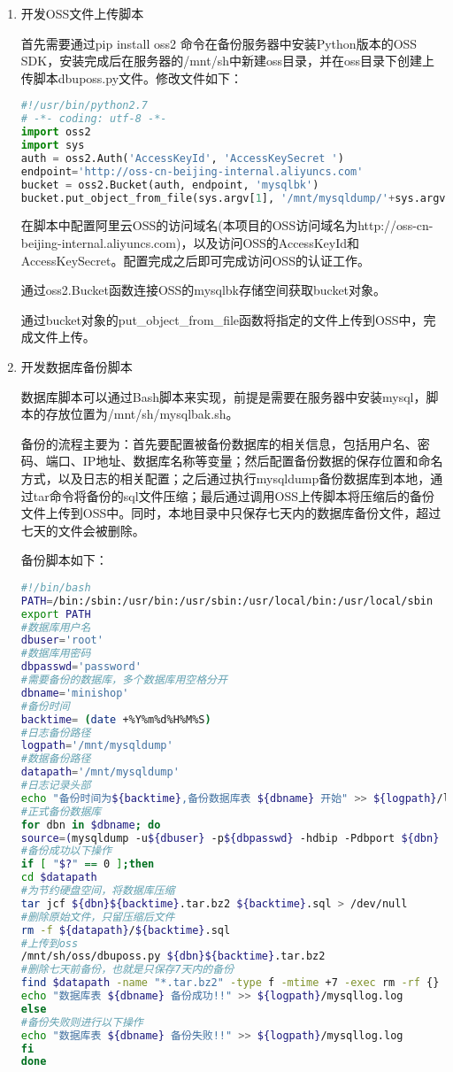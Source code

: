 \begin{enumerate}
\item 开发OSS文件上传脚本

首先需要通过pip install oss2 命令在备份服务器中安装Python版本的OSS SDK，安装完成后在服务器的/mnt/sh中新建oss目录，并在oss目录下创建上传脚本dbuposs.py文件。修改文件如下：
\begin{lstlisting}[language=python]
#!/usr/bin/python2.7
# -*- coding: utf-8 -*-
import oss2
import sys
auth = oss2.Auth('AccessKeyId', 'AccessKeySecret ')
endpoint='http://oss-cn-beijing-internal.aliyuncs.com'
bucket = oss2.Bucket(auth, endpoint, 'mysqlbk')
bucket.put_object_from_file(sys.argv[1], '/mnt/mysqldump/'+sys.argv[1])
\end{lstlisting}
在脚本中配置阿里云OSS的访问域名(本项目的OSS访问域名为http://oss-cn-beijing-internal.aliyuncs.com)，以及访问OSS的AccessKeyId和AccessKeySecret。配置完成之后即可完成访问OSS的认证工作。

通过oss2.Bucket函数连接OSS的mysqlbk存储空间获取bucket对象。

通过bucket对象的put\_object\_from\_file函数将指定的文件上传到OSS中，完成文件上传。
\item 开发数据库备份脚本

数据库脚本可以通过Bash脚本来实现，前提是需要在服务器中安装mysql，脚本的存放位置为/mnt/sh/mysqlbak.sh。

备份的流程主要为：首先要配置被备份数据库的相关信息，包括用户名、密码、端口、IP地址、数据库名称等变量；然后配置备份数据的保存位置和命名方式，以及日志的相关配置；之后通过执行mysqldump备份数据库到本地，通过tar命令将备份的sql文件压缩；最后通过调用OSS上传脚本将压缩后的备份文件上传到OSS中。同时，本地目录中只保存七天内的数据库备份文件，超过七天的文件会被删除。

备份脚本如下：
\begin{lstlisting}[language=bash]
#!/bin/bash
PATH=/bin:/sbin:/usr/bin:/usr/sbin:/usr/local/bin:/usr/local/sbin
export PATH
#数据库用户名
dbuser='root'
#数据库用密码
dbpasswd='password'
#需要备份的数据库，多个数据库用空格分开
dbname='minishop'
#备份时间
backtime= (date +%Y%m%d%H%M%S)
#日志备份路径
logpath='/mnt/mysqldump'
#数据备份路径
datapath='/mnt/mysqldump'
#日志记录头部
echo "备份时间为${backtime},备份数据库表 ${dbname} 开始" >> ${logpath}/log.log
#正式备份数据库
for dbn in $dbname; do
source=(mysqldump -u${dbuser} -p${dbpasswd} -hdbip -Pdbport ${dbn} --set-gtid-purged=OFF > ${logpath}/${backtime}.sql) 2>> ${logpath}/mysqllog.log;
#备份成功以下操作
if [ "$?" == 0 ];then
cd $datapath
#为节约硬盘空间，将数据库压缩
tar jcf ${dbn}${backtime}.tar.bz2 ${backtime}.sql > /dev/null
#删除原始文件，只留压缩后文件
rm -f ${datapath}/${backtime}.sql
#上传到oss
/mnt/sh/oss/dbuposs.py ${dbn}${backtime}.tar.bz2
#删除七天前备份，也就是只保存7天内的备份
find $datapath -name "*.tar.bz2" -type f -mtime +7 -exec rm -rf {} \; > /dev/null 2>&1
echo "数据库表 ${dbname} 备份成功!!" >> ${logpath}/mysqllog.log
else
#备份失败则进行以下操作
echo "数据库表 ${dbname} 备份失败!!" >> ${logpath}/mysqllog.log
fi
done
\end{lstlisting}


\end{enumerate}
